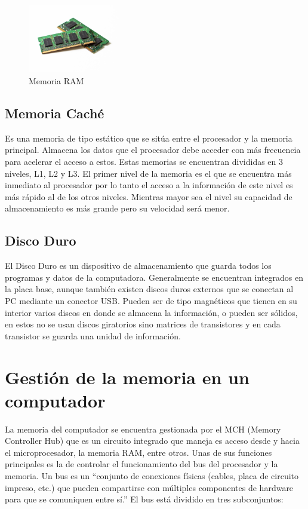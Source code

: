 \documentclass{article}
\begin{document}
\begin{figure}[h]
\includegraphics[width=4cm]{memoriaRAM.jpg}
\centering
\caption{Memoria RAM}
\end{figure}

\vfill

\subsection{Memoria Caché} 
Es una memoria de tipo estático que se sitúa entre el procesador y la memoria principal. Almacena los datos que el procesador debe acceder con más frecuencia para acelerar el acceso a estos. Estas memorias se encuentran divididas en 3 niveles, L1, L2 y L3. El primer nivel de la memoria es el que se encuentra más inmediato al procesador por lo tanto el acceso a la información de este nivel es más rápido al de los otros niveles. Mientras mayor sea el nivel su capacidad de almacenamiento es más grande pero su velocidad será menor.

\subsection{Disco Duro} 
El Disco Duro es un dispositivo de almacenamiento que guarda todos los programas y datos de la computadora.  Generalmente se encuentran integrados en la placa base, aunque también existen discos duros externos que se conectan al PC mediante un conector USB. Pueden ser de tipo magnéticos que tienen en su interior varios discos en donde se almacena la información, o pueden ser sólidos, en estos no se usan discos giratorios sino matrices de transistores y en cada transistor se guarda una unidad de información.


\section{Gestión de la memoria en un computador}
La memoria del computador se encuentra gestionada por el MCH (Memory Controller Hub)  que es un circuito integrado que maneja es acceso desde y hacia el microprocesador, la memoria RAM, entre otros. Unas de sus funciones principales es la de controlar el funcionamiento del bus del procesador y la memoria. Un bus es un “conjunto de conexiones físicas (cables, placa de circuito impreso, etc.) que pueden compartirse con múltiples componentes de hardware para que se comuniquen entre sí.”\cite{bus} El bus está dividido en tres subconjuntos:
\end{document}
